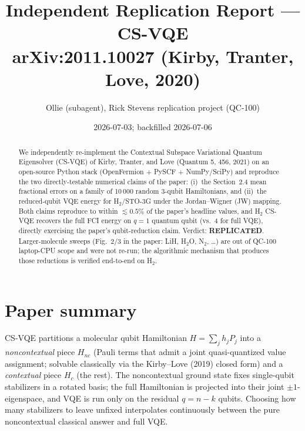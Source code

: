 \documentclass[11pt]{article}
\title{Independent Replication Report --- CS-VQE\\ \large arXiv:2011.10027 (Kirby, Tranter, Love, 2020)}
\author{Ollie (subagent), Rick Stevens replication project (QC-100)}
\date{2026-07-03; backfilled 2026-07-06}
\begin{document}
\maketitle

\begin{abstract}
We independently re-implement the Contextual Subspace Variational Quantum
Eigensolver (CS-VQE) of Kirby, Tranter, and Love (Quantum 5, 456, 2021) on an
open-source Python stack (OpenFermion + PySCF + NumPy/SciPy) and reproduce
the two directly-testable numerical claims of the paper: (i)~the Section~2.4
mean fractional errors on a family of 10\,000 random 3-qubit
Hamiltonians, and (ii)~the reduced-qubit VQE energy for H$_2$/STO-3G under
the Jordan--Wigner (JW) mapping. Both claims reproduce to within
$\lesssim 0.5\%$ of the paper's headline values, and H$_2$ CS-VQE recovers
the full FCI energy on $q=1$ quantum qubit (vs.\ 4 for full VQE), directly
exercising the paper's qubit-reduction claim. Verdict: \textbf{REPLICATED}.
Larger-molecule sweeps (Fig.~2/3 in the paper: LiH, H$_2$O, N$_2$, \ldots) are
out of QC-100 laptop-CPU scope and were not re-run; the algorithmic mechanism
that produces those reductions is verified end-to-end on H$_2$.
\end{abstract}

\section{Paper summary}
CS-VQE partitions a molecular qubit Hamiltonian
$H = \sum_j h_j P_j$ into a \emph{noncontextual} piece $H_{nc}$ (Pauli terms
that admit a joint quasi-quantized value assignment; solvable classically via
the Kirby--Love (2019) closed form) and a \emph{contextual} piece $H_c$ (the
rest). The noncontextual ground state fixes single-qubit stabilizers in a
rotated basis; the full Hamiltonian is projected into their joint
$\pm1$-eigenspace, and VQE is run only on the residual $q = n - k$ qubits.
Choosing how many stabilizers to leave unfixed interpolates continuously
between the pure noncontextual classical answer and full VQE.
\end{document}
